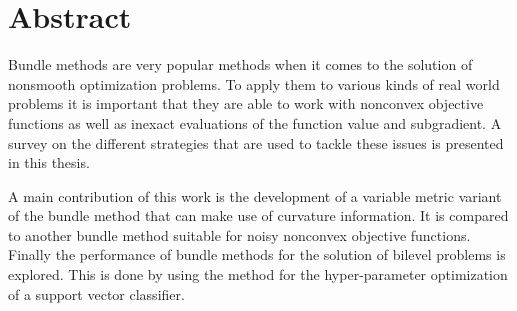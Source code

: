 \section*{Abstract}

Bundle methods are very popular methods when it comes to the solution of nonsmooth optimization problems. To apply them to various kinds of real world problems it is important that they are able to work with nonconvex objective functions as well as inexact evaluations of the function value and subgradient.
A survey on the different strategies that are used to tackle these issues is presented in this thesis.

A main contribution of this work is the development of a variable metric variant of the bundle method that can make use of curvature information.  
It is compared to another bundle method suitable for noisy nonconvex objective functions.
Finally the performance of bundle methods for the solution of bilevel problems is explored. This is done by using the method for the hyper-parameter optimization of a support vector classifier.



